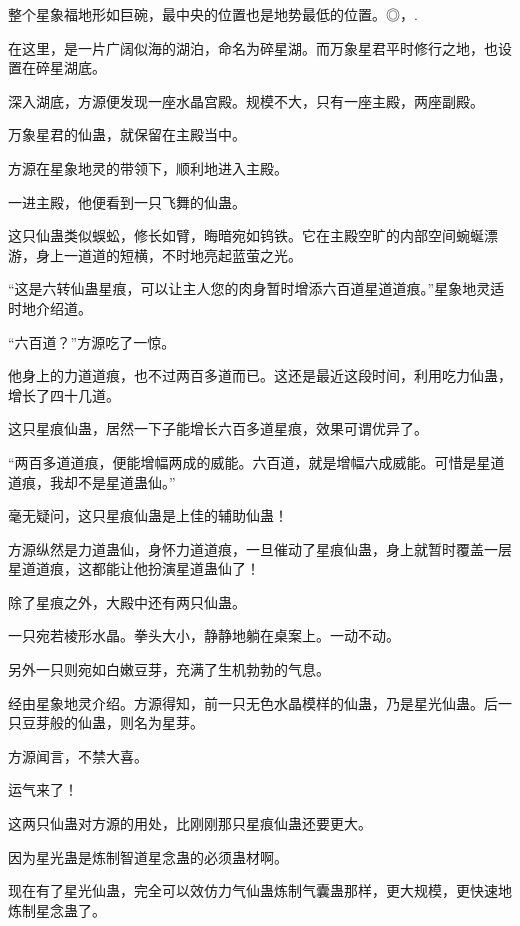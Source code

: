 
\begin{this_body}

整个星象福地形如巨碗，最中央的位置也是地势最低的位置。◎，.

在这里，是一片广阔似海的湖泊，命名为碎星湖。而万象星君平时修行之地，也设置在碎星湖底。

深入湖底，方源便发现一座水晶宫殿。规模不大，只有一座主殿，两座副殿。

万象星君的仙蛊，就保留在主殿当中。

方源在星象地灵的带领下，顺利地进入主殿。

一进主殿，他便看到一只飞舞的仙蛊。

这只仙蛊类似蜈蚣，修长如臂，晦暗宛如钨铁。它在主殿空旷的内部空间蜿蜒漂游，身上一道道的短横，不时地亮起蓝萤之光。

“这是六转仙蛊星痕，可以让主人您的肉身暂时增添六百道星道道痕。”星象地灵适时地介绍道。

“六百道？”方源吃了一惊。

他身上的力道道痕，也不过两百多道而已。这还是最近这段时间，利用吃力仙蛊，增长了四十几道。

这只星痕仙蛊，居然一下子能增长六百多道星痕，效果可谓优异了。

“两百多道道痕，便能增幅两成的威能。六百道，就是增幅六成威能。可惜是星道道痕，我却不是星道蛊仙。”

毫无疑问，这只星痕仙蛊是上佳的辅助仙蛊！

方源纵然是力道蛊仙，身怀力道道痕，一旦催动了星痕仙蛊，身上就暂时覆盖一层星道道痕，这都能让他扮演星道蛊仙了！

除了星痕之外，大殿中还有两只仙蛊。

一只宛若棱形水晶。拳头大小，静静地躺在桌案上。一动不动。

另外一只则宛如白嫩豆芽，充满了生机勃勃的气息。

经由星象地灵介绍。方源得知，前一只无色水晶模样的仙蛊，乃是星光仙蛊。后一只豆芽般的仙蛊，则名为星芽。

方源闻言，不禁大喜。

运气来了！

这两只仙蛊对方源的用处，比刚刚那只星痕仙蛊还要更大。

因为星光蛊是炼制智道星念蛊的必须蛊材啊。

现在有了星光仙蛊，完全可以效仿力气仙蛊炼制气囊蛊那样，更大规模，更快速地炼制星念蛊了。


\end{this_body}
